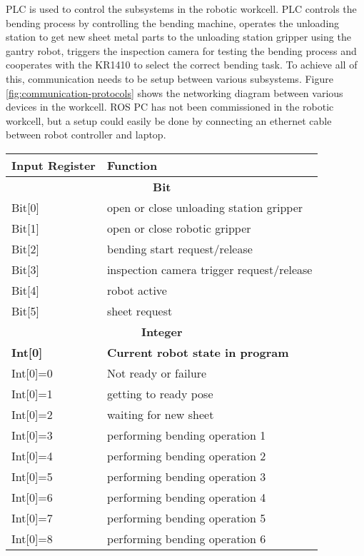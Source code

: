 PLC is used to control the subsystems in the robotic workcell. PLC controls the bending process by controlling the bending machine,
operates the unloading station to get new sheet metal parts to the unloading station gripper using the gantry robot, triggers the inspection camera for testing the bending process and cooperates with the KR1410 to select the correct bending task. To achieve all of this, communication needs to be setup between various subsystems. Figure \ref{fig:communication-protocols} shows the networking diagram between various devices in the workcell. ROS PC has not been commissioned in the robotic workcell, but a setup could easily be done by connecting an ethernet cable between
robot controller and laptop.

\begin{table}[h]
  \centering
  \small
  \renewcommand{\arraystretch}{1.2} %
  \begin{tabular}{l@{\hskip 2cm}l}
    \hline
      \textbf{Input Register} & \textbf{Function} \\ \hline
      \multicolumn{2}{c}{\textbf{Bit}} \\ \hline
      Bit[0] & open or close unloading station gripper \\
      Bit[1] & open or close robotic gripper\\
      Bit[2] & bending start request/release\\
      Bit[3] & inspection camera trigger request/release\\
      Bit[4] & robot active\\
      Bit[5] & sheet request\\\hline
      \multicolumn{2}{c}{\textbf{Integer}} \\ \hline
      \textbf{Int[0]} & \textbf{Current robot state in program}\\
      Int[0]=0 & Not ready or failure\\
      Int[0]=1 & getting to ready pose\\
      Int[0]=2 & waiting for new sheet\\
      Int[0]=3 & performing bending operation 1\\
      Int[0]=4 & performing bending operation 2\\
      Int[0]=5 & performing bending operation 3\\
      Int[0]=6 & performing bending operation 4\\
      Int[0]=7 & performing bending operation 5\\
      Int[0]=8 & performing bending operation 6\\

\end{tabular}
\end{table}
